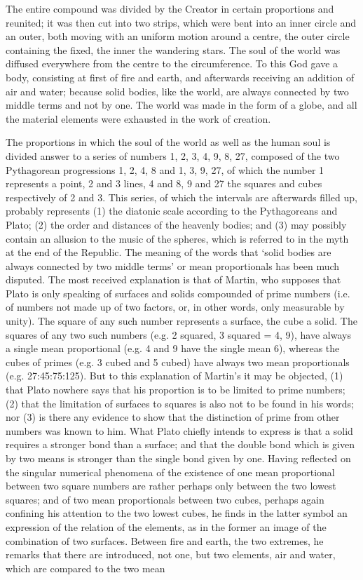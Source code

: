 \documentclass[11pt,letter]{article}
\begin{document}
\par  The entire compound was divided by the Creator in certain proportions and reunited; it was then cut into two strips, which were bent into an inner circle and an outer, both moving with an uniform motion around a centre, the outer circle containing the fixed, the inner the wandering stars. The soul of the world was diffused everywhere from the centre to the circumference. To this God gave a body, consisting at first of fire and earth, and afterwards receiving an addition of air and water; because solid bodies, like the world, are always connected by two middle terms and not by one. The world was made in the form of a globe, and all the material elements were exhausted in the work of creation.

\par  The proportions in which the soul of the world as well as the human soul is divided answer to a series of numbers 1, 2, 3, 4, 9, 8, 27, composed of the two Pythagorean progressions 1, 2, 4, 8 and 1, 3, 9, 27, of which the number 1 represents a point, 2 and 3 lines, 4 and 8, 9 and 27 the squares and cubes respectively of 2 and 3. This series, of which the intervals are afterwards filled up, probably represents (1) the diatonic scale according to the Pythagoreans and Plato; (2) the order and distances of the heavenly bodies; and (3) may possibly contain an allusion to the music of the spheres, which is referred to in the myth at the end of the Republic. The meaning of the words that ‘solid bodies are always connected by two middle terms’ or mean proportionals has been much disputed. The most received explanation is that of Martin, who supposes that Plato is only speaking of surfaces and solids compounded of prime numbers (i.e. of numbers not made up of two factors, or, in other words, only measurable by unity). The square of any such number represents a surface, the cube a solid. The squares of any two such numbers (e.g. 2 squared, 3 squared = 4, 9), have always a single mean proportional (e.g. 4 and 9 have the single mean 6), whereas the cubes of primes (e.g. 3 cubed and 5 cubed) have always two mean proportionals (e.g. 27:45:75:125). But to this explanation of Martin’s it may be objected, (1) that Plato nowhere says that his proportion is to be limited to prime numbers; (2) that the limitation of surfaces to squares is also not to be found in his words; nor (3) is there any evidence to show that the distinction of prime from other numbers was known to him. What Plato chiefly intends to express is that a solid requires a stronger bond than a surface; and that the double bond which is given by two means is stronger than the single bond given by one. Having reflected on the singular numerical phenomena of the existence of one mean proportional between two square numbers are rather perhaps only between the two lowest squares; and of two mean proportionals between two cubes, perhaps again confining his attention to the two lowest cubes, he finds in the latter symbol an expression of the relation of the elements, as in the former an image of the combination of two surfaces. Between fire and earth, the two extremes, he remarks that there are introduced, not one, but two elements, air and water, which are compared to the two mean 
\end{document}
